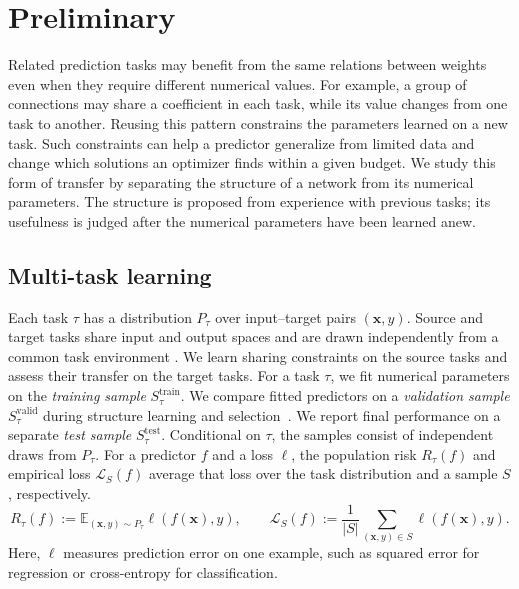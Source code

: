 \section{Preliminary}
\label{sec:preliminary}

Related prediction tasks may benefit from the same relations between
weights even when they require different numerical values. For example,
a group of connections may share a coefficient in each task, while its
value changes from one task to another. Reusing this pattern constrains the
parameters learned on a new task. Such constraints can help a predictor
generalize from limited data and change which solutions an optimizer
finds within a given budget. We study this form of transfer by separating
the structure of a network from its numerical parameters. The structure
is proposed from experience with previous tasks; its usefulness is
judged after the numerical parameters have been learned anew.

\subsection{Multi-task learning}
\label{sec:tasks}

Each task $\tau$ has a distribution $P_\tau$ over input--target
pairs $(\mathbf x,y)$. Source and target tasks share input and output
spaces and are drawn independently from a common task environment
\cite{baxter2000model}. We learn sharing constraints on the source
tasks and assess their transfer on the target tasks.
For a task $\tau$, we fit numerical parameters on the \emph{training
sample} $S_\tau^{\mathrm{train}}$. We compare fitted predictors on a
\emph{validation sample} $S_\tau^{\mathrm{valid}}$ during structure
learning and selection~\cite{finn2017model,zhou2021meta}. We report
final performance on a separate \emph{test sample} $S_\tau^{\mathrm{test}}$.
Conditional on $\tau$, the samples consist of independent draws from
$P_\tau$.
For a predictor $f$ and a loss $\ell$, the population risk
$R_\tau(f)$ and empirical loss $\mathcal L_S(f)$ average that loss
over the task distribution and a sample $S$, respectively.
\begin{equation}
    R_\tau(f):=\mathbb E_{(\mathbf x,y)\sim P_\tau}\ell(f(\mathbf x),y),
    \qquad
    \mathcal L_S(f):=\frac{1}{|S|}\sum_{(\mathbf x,y)\in S}\ell(f(\mathbf x),y).
    \label{eq:task-loss}
\end{equation}
Here, $\ell$ measures prediction error on one example, such as squared
error for regression or cross-entropy for classification.

